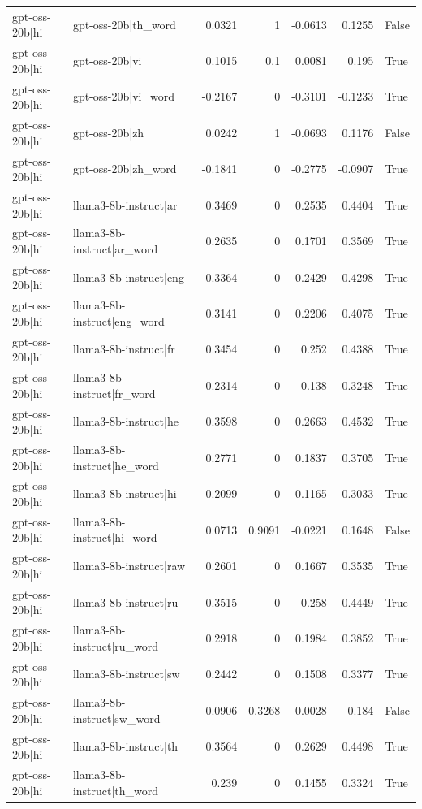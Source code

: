 \begin{table}
\begin{tabular}{l l r r r r l}
gpt-oss-20b|hi & gpt-oss-20b|th_word & 0.0321 & 1 & -0.0613 & 0.1255 & False \\
gpt-oss-20b|hi & gpt-oss-20b|vi & 0.1015 & 0.1 & 0.0081 & 0.195 & True \\
gpt-oss-20b|hi & gpt-oss-20b|vi_word & -0.2167 & 0 & -0.3101 & -0.1233 & True \\
gpt-oss-20b|hi & gpt-oss-20b|zh & 0.0242 & 1 & -0.0693 & 0.1176 & False \\
gpt-oss-20b|hi & gpt-oss-20b|zh_word & -0.1841 & 0 & -0.2775 & -0.0907 & True \\
gpt-oss-20b|hi & llama3-8b-instruct|ar & 0.3469 & 0 & 0.2535 & 0.4404 & True \\
gpt-oss-20b|hi & llama3-8b-instruct|ar_word & 0.2635 & 0 & 0.1701 & 0.3569 & True \\
gpt-oss-20b|hi & llama3-8b-instruct|eng & 0.3364 & 0 & 0.2429 & 0.4298 & True \\
gpt-oss-20b|hi & llama3-8b-instruct|eng_word & 0.3141 & 0 & 0.2206 & 0.4075 & True \\
gpt-oss-20b|hi & llama3-8b-instruct|fr & 0.3454 & 0 & 0.252 & 0.4388 & True \\
gpt-oss-20b|hi & llama3-8b-instruct|fr_word & 0.2314 & 0 & 0.138 & 0.3248 & True \\
gpt-oss-20b|hi & llama3-8b-instruct|he & 0.3598 & 0 & 0.2663 & 0.4532 & True \\
gpt-oss-20b|hi & llama3-8b-instruct|he_word & 0.2771 & 0 & 0.1837 & 0.3705 & True \\
gpt-oss-20b|hi & llama3-8b-instruct|hi & 0.2099 & 0 & 0.1165 & 0.3033 & True \\
gpt-oss-20b|hi & llama3-8b-instruct|hi_word & 0.0713 & 0.9091 & -0.0221 & 0.1648 & False \\
gpt-oss-20b|hi & llama3-8b-instruct|raw & 0.2601 & 0 & 0.1667 & 0.3535 & True \\
gpt-oss-20b|hi & llama3-8b-instruct|ru & 0.3515 & 0 & 0.258 & 0.4449 & True \\
gpt-oss-20b|hi & llama3-8b-instruct|ru_word & 0.2918 & 0 & 0.1984 & 0.3852 & True \\
gpt-oss-20b|hi & llama3-8b-instruct|sw & 0.2442 & 0 & 0.1508 & 0.3377 & True \\
gpt-oss-20b|hi & llama3-8b-instruct|sw_word & 0.0906 & 0.3268 & -0.0028 & 0.184 & False \\
gpt-oss-20b|hi & llama3-8b-instruct|th & 0.3564 & 0 & 0.2629 & 0.4498 & True \\
gpt-oss-20b|hi & llama3-8b-instruct|th_word & 0.239 & 0 & 0.1455 & 0.3324 & True \\

\end{tabular}
\end{table}
